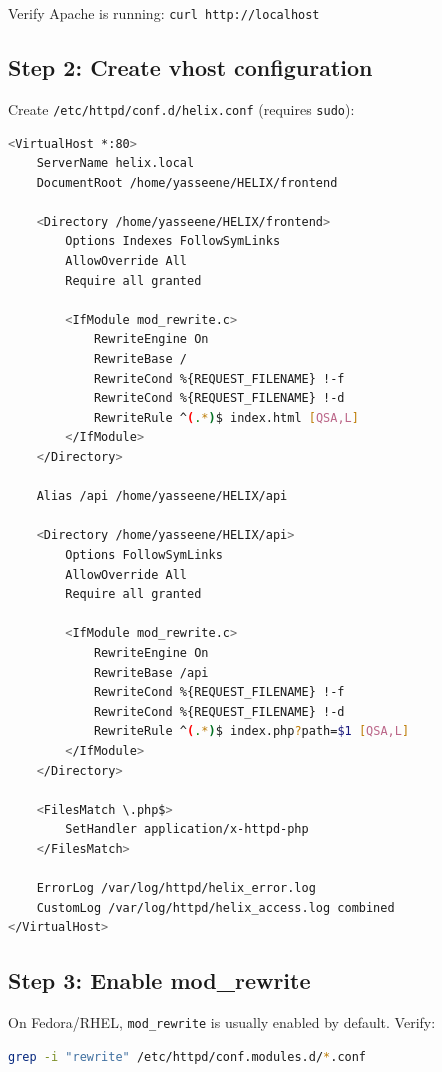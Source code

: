 \documentclass[11pt,a4paper]{report}
\newcommand{\filepath}[1]{\texttt{\small#1}}
\begin{document}
Verify Apache is running: \texttt{curl http://localhost}

\subsection*{Step 2: Create vhost configuration}

Create \filepath{/etc/httpd/conf.d/helix.conf} (requires \texttt{sudo}):

\begin{lstlisting}[language=bash]
<VirtualHost *:80>
    ServerName helix.local
    DocumentRoot /home/yasseene/HELIX/frontend

    <Directory /home/yasseene/HELIX/frontend>
        Options Indexes FollowSymLinks
        AllowOverride All
        Require all granted

        <IfModule mod_rewrite.c>
            RewriteEngine On
            RewriteBase /
            RewriteCond %{REQUEST_FILENAME} !-f
            RewriteCond %{REQUEST_FILENAME} !-d
            RewriteRule ^(.*)$ index.html [QSA,L]
        </IfModule>
    </Directory>

    Alias /api /home/yasseene/HELIX/api

    <Directory /home/yasseene/HELIX/api>
        Options FollowSymLinks
        AllowOverride All
        Require all granted

        <IfModule mod_rewrite.c>
            RewriteEngine On
            RewriteBase /api
            RewriteCond %{REQUEST_FILENAME} !-f
            RewriteCond %{REQUEST_FILENAME} !-d
            RewriteRule ^(.*)$ index.php?path=$1 [QSA,L]
        </IfModule>
    </Directory>

    <FilesMatch \.php$>
        SetHandler application/x-httpd-php
    </FilesMatch>

    ErrorLog /var/log/httpd/helix_error.log
    CustomLog /var/log/httpd/helix_access.log combined
</VirtualHost>
\end{lstlisting}

\subsection*{Step 3: Enable mod\_rewrite}

On Fedora/RHEL, \texttt{mod\_rewrite} is usually enabled by default. Verify:

\begin{lstlisting}[language=bash]
grep -i "rewrite" /etc/httpd/conf.modules.d/*.conf
\end{lstlisting}
\end{document}
